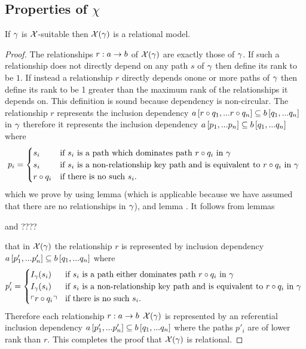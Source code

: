 \subsection{Properties of $\chi$}
\begin{lemma}
If $\gamma$ is $\mathcal{X}$-suitable then $\mathcal{X}(\gamma)$ is a relational model.
\end{lemma}
\begin{proof}
The relationships $r: a \rightarrow b$ of $\mathcal{X}(\gamma)$ are exactly those of $\gamma$. If such a relationship does not directly depend on any path $s$ of $\gamma$ then define its rank to be $1$.
If instead a relationship $r$ directly depends onone or more paths of $\gamma$ then define its rank to be 1 greater than the maximum rank of the relationships it depends on. 
This definition is sound because dependency is non-circular.
The relationship $r$ represents the inclusion dependency $a\left[r \circ q_1,...r \circ q_n\right]\subseteq b\left[q_1,...q_n\right]$ in $\gamma$ therefore it represents
the inclusion dependency $a\left[p_1,...p_n\right]\subseteq b\left[q_1,...q_n\right]$ where 
$$
p_i =
\begin{cases} 
    s_i         & \mbox{if $s_i$ is a path which dominates path $r \circ q_i$ in $\gamma$} \\
    s_i         & \mbox{if $s_i$ is a non-relationship key path and is equivalent to  $r \circ q_i$ in $\gamma$ }  \\
    r \circ q_i & \mbox{if there is no such $s_i$.}
\end{cases} 
$$
which we prove by using lemma  (which is applicable because we have assumed 
that there are no   relationships in $\gamma$), and lemma .
It follows from lemmas \begin{newtt}   and  ???? \end{newtt} that in $\mathcal{X}(\gamma)$ the relationship $r$ is represented by inclusion dependency $a\left[p'_1,...p'_n\right]\subseteq b\left[q_1,...q_n\right]$ where
$$
p'_i =
\begin{cases}
   I_\gamma(s_i)     & \mbox{if $s_i$ is a path  either dominates path $r \circ q_i$ in $\gamma$} \\
   I_\gamma(s_i)     & \mbox{if $s_i$ is a non-relationship key path and is equivalent to  $r \circ q_i$ in $\gamma$ }  \\
   \left\ulcorner r \circ q_i\right\urcorner  & \mbox{if there is no such $s_i$.}
\end{cases} 
$$
Therefore each relationship $r: a \rightarrow b$ $\mathcal{X}(\gamma)$ is represented by an referential inclusion dependency $a\left[p'_1,...p'_n\right]\subseteq b\left[q_1,...q_n\right]$
where the paths $p'_i$ are of lower rank than $r$. This completes the proof that $\mathcal{X}(\gamma)$ is relational.
\end{proof}


